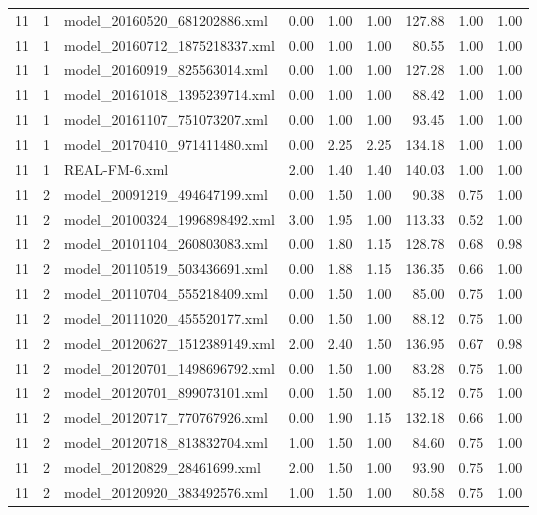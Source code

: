 \begin{table}[ht]
\begin{tabular}{rrlrrrrrr}
   11 &   1 & model\_20160520\_681202886.xml & 0.00 & 1.00 & 1.00 & 127.88 & 1.00 & 1.00 \\ 
   11 &   1 & model\_20160712\_1875218337.xml & 0.00 & 1.00 & 1.00 & 80.55 & 1.00 & 1.00 \\ 
   11 &   1 & model\_20160919\_825563014.xml & 0.00 & 1.00 & 1.00 & 127.28 & 1.00 & 1.00 \\ 
   11 &   1 & model\_20161018\_1395239714.xml & 0.00 & 1.00 & 1.00 & 88.42 & 1.00 & 1.00 \\ 
   11 &   1 & model\_20161107\_751073207.xml & 0.00 & 1.00 & 1.00 & 93.45 & 1.00 & 1.00 \\ 
   11 &   1 & model\_20170410\_971411480.xml & 0.00 & 2.25 & 2.25 & 134.18 & 1.00 & 1.00 \\ 
   11 &   1 & REAL-FM-6.xml & 2.00 & 1.40 & 1.40 & 140.03 & 1.00 & 1.00 \\ 
   11 &   2 & model\_20091219\_494647199.xml & 0.00 & 1.50 & 1.00 & 90.38 & 0.75 & 1.00 \\ 
   11 &   2 & model\_20100324\_1996898492.xml & 3.00 & 1.95 & 1.00 & 113.33 & 0.52 & 1.00 \\ 
   11 &   2 & model\_20101104\_260803083.xml & 0.00 & 1.80 & 1.15 & 128.78 & 0.68 & 0.98 \\ 
   11 &   2 & model\_20110519\_503436691.xml & 0.00 & 1.88 & 1.15 & 136.35 & 0.66 & 1.00 \\ 
   11 &   2 & model\_20110704\_555218409.xml & 0.00 & 1.50 & 1.00 & 85.00 & 0.75 & 1.00 \\ 
   11 &   2 & model\_20111020\_455520177.xml & 0.00 & 1.50 & 1.00 & 88.12 & 0.75 & 1.00 \\ 
   11 &   2 & model\_20120627\_1512389149.xml & 2.00 & 2.40 & 1.50 & 136.95 & 0.67 & 0.98 \\ 
   11 &   2 & model\_20120701\_1498696792.xml & 0.00 & 1.50 & 1.00 & 83.28 & 0.75 & 1.00 \\ 
   11 &   2 & model\_20120701\_899073101.xml & 0.00 & 1.50 & 1.00 & 85.12 & 0.75 & 1.00 \\ 
   11 &   2 & model\_20120717\_770767926.xml & 0.00 & 1.90 & 1.15 & 132.18 & 0.66 & 1.00 \\ 
   11 &   2 & model\_20120718\_813832704.xml & 1.00 & 1.50 & 1.00 & 84.60 & 0.75 & 1.00 \\ 
   11 &   2 & model\_20120829\_28461699.xml & 2.00 & 1.50 & 1.00 & 93.90 & 0.75 & 1.00 \\ 
   11 &   2 & model\_20120920\_383492576.xml & 1.00 & 1.50 & 1.00 & 80.58 & 0.75 & 1.00 \\ 

\end{tabular}
\end{table}
